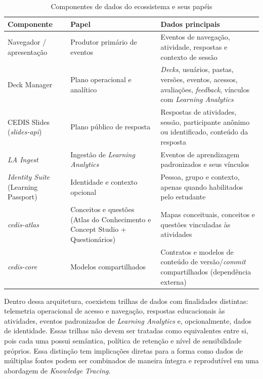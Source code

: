 \begin{table}[htb]
\caption{Componentes de dados do ecossistema e seus papéis}
\label{tab:componentes-cedis}
\centering
\begin{tabularx}{\textwidth}{l>{\raggedright\arraybackslash}X>{\raggedright\arraybackslash}X}
\hline
\textbf{Componente} & \textbf{Papel} & \textbf{Dados principais} \\
\hline
Navegador / apresentação & Produtor primário de eventos & Eventos de navegação, atividade, respostas e contexto de sessão \\
\hline
Deck Manager & Plano operacional e analítico & \textit{Decks}, usuários, pastas, versões, eventos, acessos, avaliações, \textit{feedback}, vínculos com \textit{Learning Analytics} \\
\hline
CEDIS Slides (\textit{slides-api}) & Plano público de resposta & Respostas de atividades, sessão, participante anônimo ou identificado, conteúdo da resposta \\
\hline
\textit{LA Ingest} & Ingestão de \textit{Learning Analytics} & Eventos de aprendizagem padronizados e seus vínculos \\
\hline
\textit{Identity Suite} (Learning Passport) & Identidade e contexto opcional & Pessoa, grupo e contexto, apenas quando habilitados pelo estudante \\
\hline
\textit{cedis-atlas} & Conceitos e questões (Atlas do Conhecimento e Concept Studio + Questionários) & Mapas conceituais, conceitos e questões vinculadas às atividades \\
\hline
\textit{cedis-core} & Modelos compartilhados & Contratos e modelos de conteúdo de versão/\textit{commit} compartilhados (dependência externa) \\
\hline
\end{tabularx}
\end{table}

Dentro dessa arquitetura, coexistem trilhas de dados com finalidades
distintas: telemetria operacional de acesso e navegação, respostas
educacionais às atividades, eventos padronizados de \textit{Learning
Analytics} e, opcionalmente, dados de identidade. Essas trilhas não devem
ser tratadas como equivalentes entre si, pois cada uma possui semântica,
política de retenção e nível de sensibilidade próprios. Essa distinção tem
implicações diretas para a forma como dados de múltiplas fontes podem ser
combinados de maneira íntegra e reprodutível em uma abordagem de
\textit{Knowledge Tracing}.

